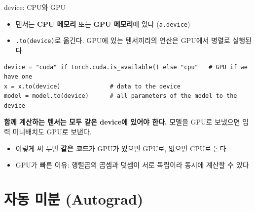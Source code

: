 \documentclass[aspectratio=169,11pt]{beamer}
\newcommand{\code}[1]{\texttt{#1}}
\begin{document}
\begin{frame}[fragile]{device: CPU와 GPU}
\begin{itemize}
\item 텐서는 \textbf{CPU 메모리} 또는 \textbf{GPU 메모리}에 있다 (\code{a.device})
\item \code{.to(device)}로 옮긴다. GPU에 있는 텐서끼리의 연산은 GPU에서 병렬로 실행된다
\end{itemize}
\begin{lstlisting}
device = "cuda" if torch.cuda.is_available() else "cpu"   # GPU if we have one
x = x.to(device)              # data to the device
model = model.to(device)      # all parameters of the model to the device
\end{lstlisting}
\begin{keybox}[규칙]
\textbf{함께 계산하는 텐서는 모두 같은 device에 있어야 한다.}
모델을 GPU로 보냈으면 입력 미니배치도 GPU로 보낸다.
\end{keybox}
\begin{itemize}
\item 이렇게 써 두면 \textbf{같은 코드}가 GPU가 있으면 GPU로, 없으면 CPU로 돈다
\item GPU가 빠른 이유: 행렬곱의 곱셈과 덧셈이 서로 독립이라 동시에 계산할 수 있다
\end{itemize}
\end{frame}

\section{자동 미분 (Autograd)}
\end{document}
